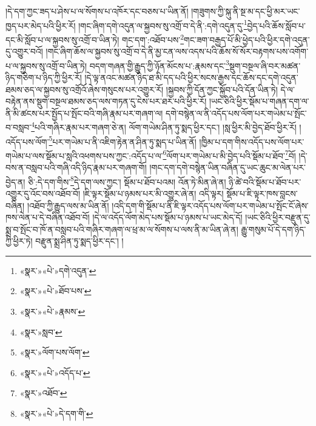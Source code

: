 །དེ་དག་ཀྱང་ཟད་པ་ཤེས་པ་ལ་སོགས་པ་འཁོར་དང་བཅས་པ་ཡིན་ནོ། །གཟུགས་ཀྱི་སྐུ་ནི་སྔ་མ་དང་ཕྱི་མར་ཡང་ཁྱད་པར་མེད་པའི་ཕྱིར་རོ། །གང་ཞིག་དགེ་འདུན་ལ་སྐྱབས་སུ་འགྲོ་བ་དེ་ནི་:དགེ་འདུན་དུ་\footnote{«སྣར་»«པེ་»དགེ་འདུན་}བྱེད་པའི་ཆོས་སློབ་པ་དང་མི་སློབ་པ་ལ་སྐྱབས་སུ་འགྲོ་བ་ཡིན་ཏེ། གང་དག་:འཐོབ་པས་\footnote{«སྣར་»«པེ་»ཐོབ་པས་}གང་ཟག་བརྒྱད་པོ་མི་ཕྱེད་པའི་ཕྱིར་དགེ་འདུན་དུ་འགྱུར་བའོ། །གང་ཞིག་ཆོས་ལ་སྐྱབས་སུ་འགྲོ་བ་དེ་ནི་མྱ་ངན་ལས་འདས་པའི་ཆོས་སོ་སོར་བརྟགས་པས་འགོག་པ་ལ་སྐྱབས་སུ་འགྲོ་བ་ཡིན་ཏེ། བདག་གཞན་གྱི་རྒྱུད་ཀྱི་ཉོན་མོངས་པ་:རྣམས་དང་\footnote{«སྣར་»«པེ་»རྣམས་}སྡུག་བསྔལ་ཞི་བར་མཚན་ཉིད་གཅིག་པ་ཉིད་ཀྱི་ཕྱིར་རོ། །དེ་ལྟ་ནའང་མཚན་ཉིད་ཐ་མི་དད་པའི་ཕྱིར་སངས་རྒྱས་དང་ཆོས་དང་དགེ་འདུན་ཐམས་ཅད་ལ་སྐྱབས་སུ་འགྲོའོ་ཞེས་གསུངས་པར་འགྱུར་རོ། །སྐྱབས་ཀྱི་དོན་ཀྱང་སྐྱོབ་པའི་དོན་ཡིན་ཏེ། དེ་ལ་བརྟེན་ནས་སྡུག་བསྔལ་ཐམས་ཅད་ལས་གཏན་དུ་ངེས་པར་ཐར་པའི་ཕྱིར་རོ། །ཡང་ཅིའི་ཕྱིར་སྡོམ་པ་གཞན་དག་ལ་ནི་མི་ཚངས་པར་སྤྱོད་པ་སྤོང་བའི་གཞི་རྣམ་པར་གཞག་ལ། དགེ་བསྙེན་ལ་ནི་འདོད་པས་ལོག་པར་གཡེམ་པ་སྤོང་བ་བསླབ་\footnote{«སྣར་»སླབ་}པའི་གཞིར་རྣམ་པར་གཞག་ཅེ་ན། ལོག་གཡེམ་ཤིན་ཏུ་སྨད་ཕྱིར་དང་། །སླ་ཕྱིར་མི་བྱེད་ཐོབ་ཕྱིར་རོ། །འདོད་པས་ལོག་\footnote{«སྣར་»ལོག་པས་ལོག་}པར་གཡེམ་པ་ནི་འཇིག་རྟེན་ན་ཤིན་ཏུ་སྨད་པ་ཡིན་ནོ། །ཁྱིམ་པ་དག་གིས་འདོད་པས་ལོག་པར་གཡེམ་པ་ལས་སྡོམ་པ་སླའི་འཕགས་པས་ཀྱང་:འདོད་པ་ལ་\footnote{«སྣར་»«པེ་»འདོད་པ་}ལོག་པར་གཡེམ་པ་མི་བྱེད་པའི་སྡོམ་པ་ཐོབ་\footnote{«སྣར་»འཐོབ་}བོ། །དེ་བས་ན་བསླབ་པའི་གཞི་འདི་ཉིད་རྣམ་པར་གཞག་གོ། །གང་དག་དགེ་བསྙེན་ཡིན་བཞིན་དུ་ཡང་ཆུང་མ་ལེན་པར་བྱེད་ན། ཅི་:དེ་དག་གིས་\footnote{«སྣར་»«པེ་»དེ་དག་གི་}དེ་དག་ལས་ཀྱང་། སྡོམ་པ་ཐོབ་པའམ། འོན་ཏེ་མིན་ཞེ་ན། ཉི་ཚེ་བའི་སྡོམ་པ་ཐོབ་པར་འགྱུར་དུ་འོང་བས་འཐོབ་བོ། །ཇི་ལྟར་སྡོམ་པ་ཉམས་པར་མི་འགྱུར་ཞེ་ན། འདི་ལྟར། སྡོམ་པ་ཇི་ལྟར་ཁས་བླངས་བཞིན། །འཐོབ་ཀྱི་རྒྱུད་ལས་མ་ཡིན་ནོ། །འདི་དག་གི་སྡོམ་པ་ནི་ཇི་ལྟར་འདོད་པས་ལོག་པར་གཡེམ་པ་སྤོང་ངོ་ཞེས་ཁས་ལེན་པ་དེ་བཞིན་འཐོབ་བོ། །དེ་ལ་འདོད་ལོག་མེད་པས་སྡོམ་པ་ཉམས་པ་ཡང་མེད་དོ། །ཡང་ཅིའི་ཕྱིར་བརྫུན་དུ་སྨྲ་བ་སྤོང་བ་ཁོ་ན་བསླབ་པའི་གཞིར་གཞག་ལ་ཕྲ་མ་ལ་སོགས་པ་ལས་ནི་མ་ཡིན་ཞེ་ན། རྒྱུ་གསུམ་པོ་དེ་དག་ཉིད་ཀྱི་ཕྱིར་ཏེ། བརྫུན་སྨྲ་ཤིན་ཏུ་སྨད་ཕྱིར་དང་། །

